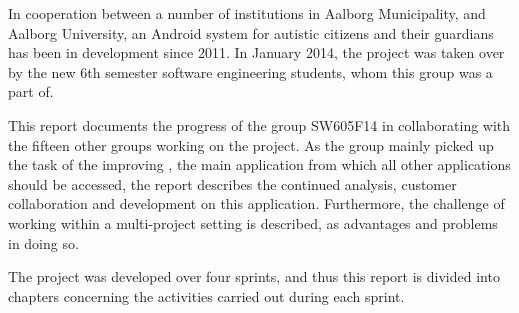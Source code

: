 In cooperation between a number of institutions in Aalborg Municipality, and Aalborg University, an Android system for autistic citizens and their guardians has been in development since 2011.
In January 2014, the project was taken over by the new 6th semester software engineering students, whom this group was a part of.

This report documents the progress of the group SW605F14 in collaborating with the fifteen other groups working on the project.
As the group mainly picked up the task of the improving \launcher, the main application from which all other applications should be accessed, the report describes the continued analysis, customer collaboration and development on this application.
Furthermore, the challenge of working within a multi-project setting is described, as advantages and problems in doing so.

The project was developed over four sprints, and thus this report is divided into chapters concerning the activities carried out during each sprint.